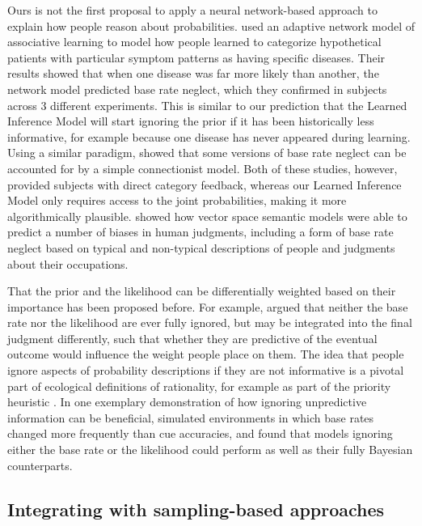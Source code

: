 Ours is not the first proposal to apply a neural network-based approach to explain how people reason about probabilities. \cite{gluck1988conditioning} used an adaptive network model of associative learning to model how people learned to categorize hypothetical patients with particular symptom patterns as having specific diseases. Their results showed that when one disease was far more likely than another, the network model predicted base rate neglect, which they confirmed in subjects across 3 different experiments. This is similar to our prediction that the Learned Inference Model will start ignoring the prior if it has been historically less informative, for example because one disease has never appeared during learning. Using a similar paradigm, \cite{shanks1991connectionist} showed that some versions of base rate neglect can be accounted for by a simple connectionist model. Both of these studies, however, provided subjects with direct category feedback, whereas our Learned Inference Model only requires access to the joint probabilities, making it more algorithmically plausible. \cite{bhatia2017associative} showed how vector space semantic models were able to predict a number of biases in human judgments, including a form of base rate neglect based on typical and non-typical descriptions of people and judgments about their occupations.

That the prior and the likelihood can be differentially weighted based on their importance has been proposed before. For example, \cite{koehler1996base} argued that neither the base rate nor the likelihood are ever fully ignored, but may be integrated into the final judgment differently, such that whether they are predictive of the eventual outcome would influence the weight people place on them. The idea that people ignore aspects of probability descriptions if they are not informative is a pivotal part of ecological definitions of rationality, for example as part of the priority heuristic \citep{brandstatter2006priority}. In one exemplary demonstration of how ignoring unpredictive information can be beneficial, \cite{todd2002testing} simulated environments in which base rates changed more frequently than cue accuracies, and found that models ignoring either the base rate or the likelihood could perform as well as their fully Bayesian counterparts.

\subsection{Integrating with sampling-based approaches}

